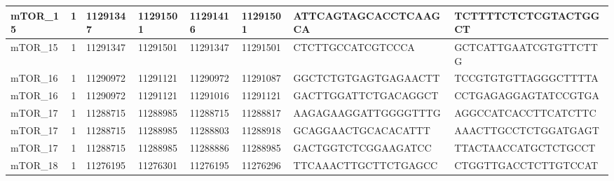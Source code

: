 \begin{landscape}
\begin{longtable}{| p{} | p{} | p{} | p{} | p{} | p{} | p{} | p{} |}
\multicolumn{1}{|l|}{mTOR\_15}   & \multicolumn{1}{c|}{1}  & \multicolumn{1}{l|}{11291347}  & \multicolumn{1}{l|}{11291501}  & \multicolumn{1}{l|}{11291416}  & \multicolumn{1}{l|}{11291501}  & \multicolumn{1}{l|}{ATTCAGTAGCACCTCAAGCA}            & \multicolumn{1}{l|}{TCTTTTCTCTCGTACTGGCT}          \\ \hline
\multicolumn{1}{|l|}{mTOR\_15}   & \multicolumn{1}{c|}{1}  & \multicolumn{1}{l|}{11291347}  & \multicolumn{1}{l|}{11291501}  & \multicolumn{1}{l|}{11291347}  & \multicolumn{1}{l|}{11291501}  & \multicolumn{1}{l|}{CTCTTGCCATCGTCCCA}               & \multicolumn{1}{l|}{GCTCATTGAATCGTGTTCTTG}         \\ \hline
\multicolumn{1}{|l|}{mTOR\_16}   & \multicolumn{1}{c|}{1}  & \multicolumn{1}{l|}{11290972}  & \multicolumn{1}{l|}{11291121}  & \multicolumn{1}{l|}{11290972}  & \multicolumn{1}{l|}{11291087}  & \multicolumn{1}{l|}{GGCTCTGTGAGTGAGAACTT}            & \multicolumn{1}{l|}{TCCGTGTGTTAGGGCTTTTA}          \\ \hline
\multicolumn{1}{|l|}{mTOR\_16}   & \multicolumn{1}{c|}{1}  & \multicolumn{1}{l|}{11290972}  & \multicolumn{1}{l|}{11291121}  & \multicolumn{1}{l|}{11291016}  & \multicolumn{1}{l|}{11291121}  & \multicolumn{1}{l|}{GACTTGGATTCTGACAGGCT}            & \multicolumn{1}{l|}{CCTGAGAGGAGTATCCGTGA}          \\ \hline
\multicolumn{1}{|l|}{mTOR\_17}   & \multicolumn{1}{c|}{1}  & \multicolumn{1}{l|}{11288715}  & \multicolumn{1}{l|}{11288985}  & \multicolumn{1}{l|}{11288715}  & \multicolumn{1}{l|}{11288817}  & \multicolumn{1}{l|}{AAGAGAAGGATTGGGGTTTG}            & \multicolumn{1}{l|}{AGGCCATCACCTTCATCTTC}          \\ \hline
\multicolumn{1}{|l|}{mTOR\_17}   & \multicolumn{1}{c|}{1}  & \multicolumn{1}{l|}{11288715}  & \multicolumn{1}{l|}{11288985}  & \multicolumn{1}{l|}{11288803}  & \multicolumn{1}{l|}{11288918}  & \multicolumn{1}{l|}{GCAGGAACTGCACACATTT}             & \multicolumn{1}{l|}{AAACTTGCCTCTGGATGAGT}          \\ \hline
\multicolumn{1}{|l|}{mTOR\_17}   & \multicolumn{1}{c|}{1}  & \multicolumn{1}{l|}{11288715}  & \multicolumn{1}{l|}{11288985}  & \multicolumn{1}{l|}{11288886}  & \multicolumn{1}{l|}{11288985}  & \multicolumn{1}{l|}{GACTGGTCTCGGAAGATCC}             & \multicolumn{1}{l|}{TTACTAACCATGCTCTGCCT}          \\ \hline
\multicolumn{1}{|l|}{mTOR\_18}   & \multicolumn{1}{c|}{1}  & \multicolumn{1}{l|}{11276195}  & \multicolumn{1}{l|}{11276301}  & \multicolumn{1}{l|}{11276195}  & \multicolumn{1}{l|}{11276296}  & \multicolumn{1}{l|}{TTCAAACTTGCTTCTGAGCC}            & \multicolumn{1}{l|}{CTGGTTGACCTCTTGTCCAT}          \\ \hline

\end{longtable}
\end{landscape}

